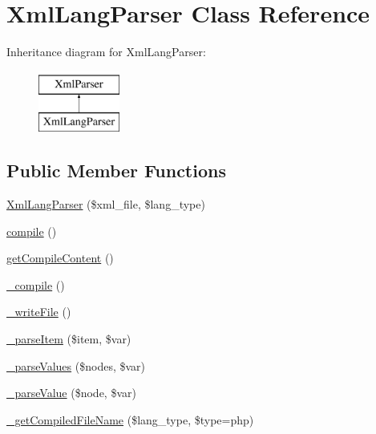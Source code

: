 \hypertarget{classXmlLangParser}{}\section{Xml\+Lang\+Parser Class Reference}
\label{classXmlLangParser}
Inheritance diagram for Xml\+Lang\+Parser\+:\begin{figure}[H]
\begin{center}
\leavevmode
\includegraphics[height=2.000000cm]{classXmlLangParser}
\end{center}
\end{figure}
\subsection*{Public Member Functions}
\begin{DoxyCompactItemize}
\item 
\hyperlink{classXmlLangParser_a50fff41b01cd305204a85b48702a4e6f}{Xml\+Lang\+Parser} (\$xml\+\_\+file, \$lang\+\_\+type)
\item 
\hyperlink{classXmlLangParser_af0ffe6cf9e15d7af2ca16d5d9b7d5da1}{compile} ()
\item 
\hyperlink{classXmlLangParser_ab022a8d8d0717fbf4c8a171eaf6a54d2}{get\+Compile\+Content} ()
\item 
\hyperlink{classXmlLangParser_a6a27a9fbdd65d3ea3249120f8eb7d9c2}{\+\_\+compile} ()
\item 
\hyperlink{classXmlLangParser_ab49d81ff3d154da6c5d92f0367d33ec9}{\+\_\+write\+File} ()
\item 
\hyperlink{classXmlLangParser_a87379004e371e1812094e2bf802b274c}{\+\_\+parse\+Item} (\$item, \$var)
\item 
\hyperlink{classXmlLangParser_ac5ab3f7e29a914802e1b6144e6e8bcc5}{\+\_\+parse\+Values} (\$nodes, \$var)
\item 
\hyperlink{classXmlLangParser_a45b4e9645eb03c7ff7bdbda239148867}{\+\_\+parse\+Value} (\$node, \$var)
\item 
\hyperlink{classXmlLangParser_ab830e8a2038e1454e9fb660f8c0719a9}{\+\_\+get\+Compiled\+File\+Name} (\$lang\+\_\+type, \$type=\textquotesingle{}php\textquotesingle{})
\end{DoxyCompactItemize}
